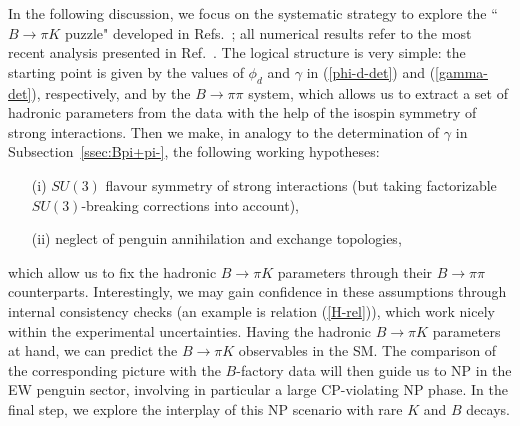 \documentclass[11pt]{cernrep}
\begin{document}
In the following discussion, we focus on the systematic
strategy to explore the ``$B\to\pi K$ puzzle"  developed in Refs.~\cite{BFRS2,BFRS3}; 
all numerical results refer to the most recent analysis presented in 
Ref.~\cite{BFRS-5}. The logical structure is very simple: the starting point is
given by the values of $\phi_d$ and $\gamma$ in (\ref{phi-d-det})
and (\ref{gamma-det}), respectively, and by the $B\to\pi\pi$ system, 
which allows us to extract a set of hadronic parameters from the data
with the help of the isospin symmetry of strong interactions. Then we make, in
analogy to the determination of $\gamma$ in Subsection~\ref{ssec:Bpi+pi-}, 
the following working hypotheses:
\begin{itemize}
\item[(i)] $SU(3)$ flavour symmetry of strong interactions (but taking factorizable 
$SU(3)$-breaking corrections into account),
\item[(ii)] neglect of penguin annihilation and exchange topologies,
\end{itemize}
which allow us to fix the hadronic $B\to\pi K$ parameters through their $B\to\pi\pi$
counterparts. Interestingly, we may gain confidence in these assumptions through 
internal consistency checks (an example is relation (\ref{H-rel})), which work nicely
within the experimental uncertainties. Having the hadronic $B\to\pi K$ parameters
at hand, we can predict the $B\to \pi K$ observables in the SM. The comparison
of the corresponding picture with the $B$-factory data will then guide us to NP
in the EW penguin sector, involving in particular a large CP-violating NP phase. In the
final step, we explore the interplay of this NP scenario with rare $K$ and $B$
decays. 


%
%
%
\boldmath
\end{document}
